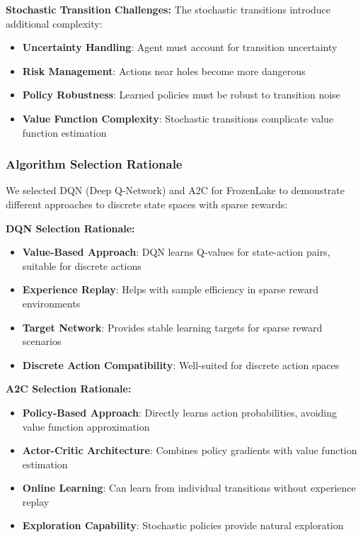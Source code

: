 \documentclass[12pt]{article}
\begin{document}
{{{\textbf{Stochastic Transition Challenges:}
The stochastic transitions introduce additional complexity:

\begin{itemize}
    \item \textbf{Uncertainty Handling}: Agent must account for transition uncertainty
    \item \textbf{Risk Management}: Actions near holes become more dangerous
    \item \textbf{Policy Robustness}: Learned policies must be robust to transition noise
    \item \textbf{Value Function Complexity}: Stochastic transitions complicate value function estimation
\end{itemize}

\subsubsection{Algorithm Selection Rationale}

We selected DQN (Deep Q-Network) and A2C for FrozenLake to demonstrate different approaches to discrete state spaces with sparse rewards:

\textbf{DQN Selection Rationale:}
\begin{itemize}
    \item \textbf{Value-Based Approach}: DQN learns Q-values for state-action pairs, suitable for discrete actions
    \item \textbf{Experience Replay}: Helps with sample efficiency in sparse reward environments
    \item \textbf{Target Network}: Provides stable learning targets for sparse reward scenarios
    \item \textbf{Discrete Action Compatibility}: Well-suited for discrete action spaces
\end{itemize}

\textbf{A2C Selection Rationale:}
\begin{itemize}
    \item \textbf{Policy-Based Approach}: Directly learns action probabilities, avoiding value function approximation
    \item \textbf{Actor-Critic Architecture}: Combines policy gradients with value function estimation
    \item \textbf{Online Learning}: Can learn from individual transitions without experience replay
    \item \textbf{Exploration Capability}: Stochastic policies provide natural exploration
\end{itemize}

}}}
\end{document}
